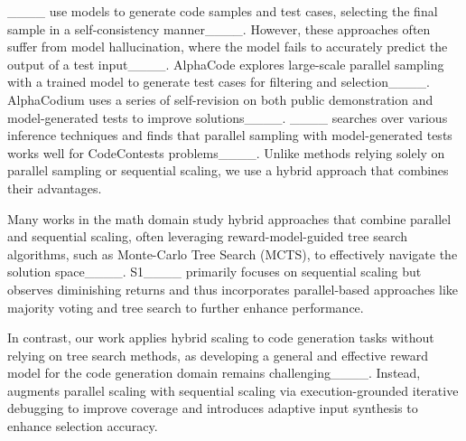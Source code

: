 ____ use models to generate code samples and test cases, selecting the final sample in a self-consistency manner____. However, these approaches often suffer from model hallucination, where the model fails to accurately predict the output of a test input____.
AlphaCode explores large-scale parallel sampling with a trained model to generate test cases for filtering and selection____. AlphaCodium uses a series of self-revision on both public demonstration and model-generated tests to improve solutions____. ____ searches over various inference techniques and finds that parallel sampling with model-generated tests works well for CodeContests problems____. Unlike methods relying solely on parallel sampling or sequential scaling, we use a hybrid approach that combines their advantages.



Many works in the math domain study hybrid approaches that combine parallel and sequential scaling, often leveraging reward-model-guided tree search algorithms, such as Monte-Carlo Tree Search (MCTS), to effectively navigate the solution space____. S1____ primarily focuses on sequential scaling but observes diminishing returns and thus incorporates parallel-based approaches like majority voting and tree search to further enhance performance.

In contrast, our work applies hybrid scaling to code generation tasks without relying on tree search methods, as developing a general and effective reward model for the code generation domain remains challenging____. Instead, \frameworkname augments parallel scaling with sequential scaling via execution-grounded iterative debugging to improve coverage and introduces adaptive input synthesis to enhance selection accuracy.

